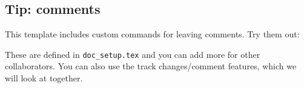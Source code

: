 \documentclass[../main.tex]{subfiles}
\begin{document}
\vspace{1em} %

\subsection*{Tip: comments}
This template includes custom commands for leaving comments. Try them out:




These are defined in \texttt{doc\_setup.tex} and you can add more for other collaborators. You can also use the track changes/comment features, which we will look at together. 

\clearpage
\end{document}

